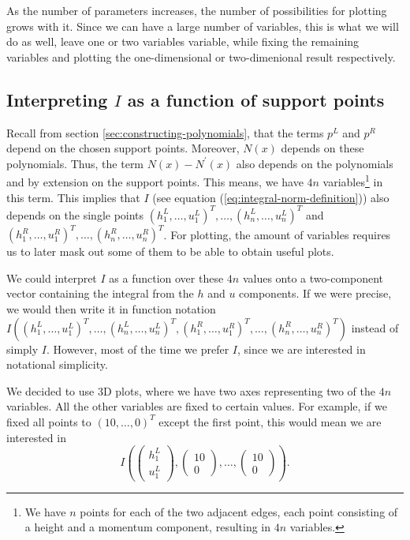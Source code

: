 \documentclass{article}
\begin{document}
As the number of parameters increases, the number of possibilities for plotting grows with it.
Since we can have a large number of variables, this is what we will do as well, leave one or two variables variable, while fixing the remaining variables and plotting the one-dimensional or two-dimenional result respectively.

\subsection{\texorpdfstring{Interpreting $I$ as a function of support points}{Interpreting I as a function of support points}}
\label{sec:some-considerations}

Recall from section \ref{sec:constructing-polynomials}, that the terms $p^L$ and $p^R$ depend on the chosen support points. Moreover, $N\left(x\right)$ depends on these polynomials. Thus, the term $N\left(x\right)-N^\prime\left(x\right)$ also depends on the polynomials and by extension on the support points. This means, we have $4n$ variables\footnote{We have $n$ points for each of the two adjacent edges, each point consisting of a height and a momentum component, resulting in $4n$ variables.} in this term.
This implies that $I$ (see equation (\ref{eq:integral-norm-definition})) also depends on the single points
$( h_1^L , \dots, u_1^L)^T ,\dots, ( h_n^L , \dots, u_n^L)^T$ and $( h_1^R , \dots, u_1^R)^T ,\dots,( h_n^R , \dots, u_n^R)^T $.
For plotting, the amount of variables requires us to later mask out some of them to be able to obtain useful plots.

We could interpret $I$ as a function over these $4n$ values onto a two-component vector containing the integral from the $h$ and $u$ components. If we were precise, we would then write it in function notation $
I\left(
  ( h_1^L , \dots, u_1^L)^T ,\dots,
( h_n^L , \dots, u_n^L)^T ,
( h_1^R , \dots, u_1^R)^T ,\dots,
( h_n^R , \dots, u_n^R)^T \right)$ instead of simply $I$. However, most of the time we prefer $I$, since we are interested in notational simplicity.

We decided to use 3D plots, where we have two axes representing two of the $4n$ variables. All the other variables are fixed to certain values.
For example, if we fixed all points to $( 10 , \dots, 0)^T$ except the first point, this would mean we are interested in
\begin{equation*}
  I\left(
    \begin{pmatrix}
      h_1^L \\ u_1^L
    \end{pmatrix},
    \begin{pmatrix}
      10 \\ 0
    \end{pmatrix}, \dots,
    \begin{pmatrix}
      10 \\ 0
    \end{pmatrix}
  \right).
\end{equation*}
\end{document}
